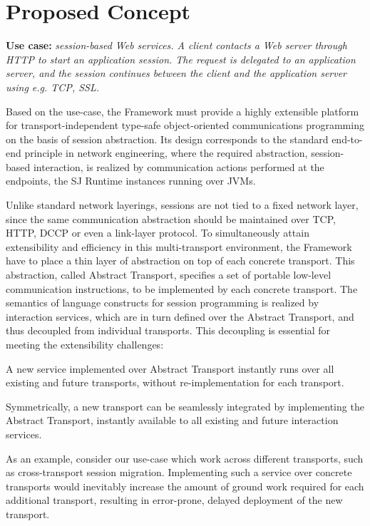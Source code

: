 \section{Proposed Concept}

\textbf{Use case:} \textit{session-based Web services. A client contacts a Web server through HTTP to start an application session. The request is delegated to an application server, and the session continues between the client and the application server using e.g. TCP, SSL.}

Based on the use-case,  the Framework must provide a highly extensible platform for transport-independent type-safe object-oriented communications programming on the basis of session abstraction. Its design corresponds to the standard end-to-end principle in network engineering, where the required abstraction, session-based interaction, is realized by communication actions performed at the endpoints, the SJ Runtime instances running over JVMs.

Unlike standard network layerings, sessions are not tied to a fixed network layer, since the same communication abstraction should be maintained over TCP, HTTP, DCCP or even a link-layer protocol. To simultaneously attain extensibility and efficiency in this multi-transport environment, the Framework have to place a thin layer of abstraction on top of each concrete transport. This abstraction, called Abstract Transport, specifies a set of portable low-level communication instructions, to be implemented by each concrete transport. The semantics of language constructs for session programming is realized by  interaction services, which are in turn defined over the Abstract Transport, and thus decoupled from individual transports. This decoupling is essential for meeting the extensibility challenges:

\begin{compactenum}
\item  A new service implemented over Abstract Transport instantly runs over all existing and future transports, without re-implementation for each transport. 

\item   Symmetrically, a new transport can be seamlessly integrated by implementing the Abstract Transport, instantly available to all existing and future interaction services.
\end{compactenum}

As an example, consider our use-case which work across different transports, such as cross-transport session migration. Implementing such a service over concrete transports would inevitably increase the amount of ground work required for each additional transport, resulting in error-prone, delayed deployment of the new transport.

